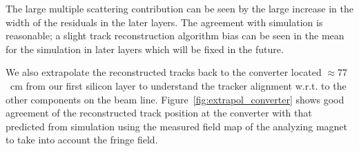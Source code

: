 The large multiple scattering contribution can be seen by the large increase in the width of the residuals in the later layers. The agreement with simulation is reasonable; a slight track reconstruction algorithm bias can be seen in the mean for the simulation in later layers which will be fixed in the future. 

We also extrapolate the reconstructed tracks back to the converter located $\approx 77$~cm 
from our first silicon layer to understand the tracker alignment w.r.t. to the other components on the 
beam line. Figure~\ref{fig:extrapol_converter} shows good agreement of the reconstructed track position at the converter with that predicted from simulation using the measured field map of the analyzing magnet to take into account the fringe field. 
